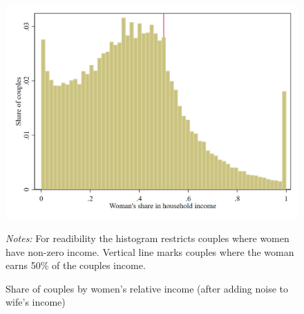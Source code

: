 \begin{figure}[H]
\centering
\caption{Share of couples by women's relative income (after adding noise to wife's income)}
\label{fig:figure_2}
\includegraphics[width=.5\textwidth]{../../results/figures/figure_2.png}
\par \begin{minipage}[h]{\textwidth}{\scriptsize\textit{Notes:} For readibility the histogram restricts couples where women have non-zero income. Vertical line marks couples where the woman earns 50\% of the couples income.}\end{minipage}
\end{figure}
